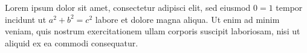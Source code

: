 Lorem ipsum dolor sit amet, consectetur adipisci elit, sed eiusmod \(0 = 1\) tempor incidunt ut $a^{2} + b^{2} = c^{2}$ labore et dolore magna aliqua.  Ut enim ad minim veniam, quis nostrum exercitationem ullam corporis suscipit laboriosam, nisi ut aliquid ex ea commodi consequatur.
